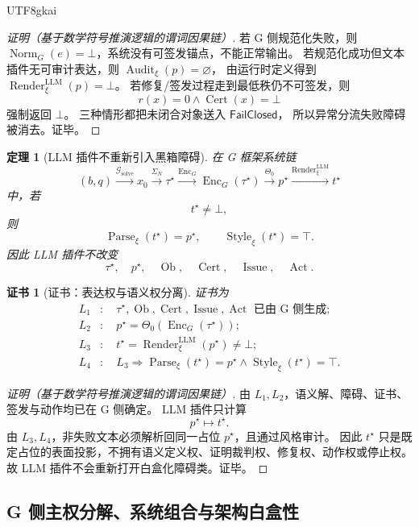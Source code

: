 \documentclass[12pt]{article}
\newtheorem{theorem}{定理}[section]
\newtheorem{Certificate}{证书}[section]
\newcommand{\FailClosed}{\mathsf{FailClosed}}
\newcommand{\Cert}{\operatorname{Cert}}
\newcommand{\Norm}{\operatorname{Norm}}
\newcommand{\Render}{\operatorname{Render}}
\newcommand{\Parse}{\operatorname{Parse}}
\newcommand{\Audit}{\operatorname{Audit}}
\newcommand{\Style}{\operatorname{Style}}
\newcommand{\Issue}{\operatorname{Issue}}
\newcommand{\Enc}{\operatorname{Enc}}
\newcommand{\Act}{\operatorname{Act}}
\begin{document}
\begin{CJK*}{UTF8}{gkai}
\begin{proof}[证明（基于数学符号推演逻辑的谓词因果链）]
若 G 侧规范化失败，则 \(\Norm_G(e)=\bot\)，系统没有可签发锚点，不能正常输出。
若规范化成功但文本插件无可审计表达，则 \(\Audit_\xi(p)=\varnothing\)，
由运行时定义得到 \(\Render_\xi^{\mathrm{LLM}}(p)=\bot\)。
若修复/签发过程走到最低秩仍不可签发，则
\[
  r(x)=0\wedge\Cert(x)=\bot
\]
强制返回 \(\bot\)。
三种情形都把未闭合对象送入 \(\FailClosed\)，
所以异常分流失败障碍被消去。证毕。
\end{proof}

\begin{theorem}[LLM 插件不重新引入黑箱障碍]
\label{thm:tex51-llm-plugin-no-reopen}
在 G 框架系统链
\[
  (b,q)
  \xrightarrow{\mathcal G_{\mathrm{solve}}}
  x_0
  \xrightarrow{\Sigma_N}
  \tau^\star
  \xrightarrow{\Enc_G}
  \Enc_G(\tau^\star)
  \xrightarrow{\Theta_0}
  p^\star
  \xrightarrow{\Render_\xi^{\mathrm{LLM}}}
  t^\star
\]
中，若
\[
  t^\star\ne\bot,
\]
则
\[
  \Parse_\xi(t^\star)=p^\star,
  \qquad
  \Style_\xi(t^\star)=\top.
\]
因此 LLM 插件不改变
\[
  \tau^\star,\quad p^\star,\quad \operatorname{Ob},\quad \Cert,\quad \Issue,\quad \Act.
\]
\end{theorem}

\begin{Certificate}[证书：表达权与语义权分离]
\label{cert:tex51-llm-plugin-no-reopen}
证书为
\[
\begin{aligned}
  L_1&:\quad \tau^\star,\operatorname{Ob},\Cert,\Issue,\Act
  \text{ 已由 G 侧生成};\\
  L_2&:\quad p^\star=\Theta_0(\Enc_G(\tau^\star));\\
  L_3&:\quad t^\star=\Render_\xi^{\mathrm{LLM}}(p^\star)\ne\bot;\\
  L_4&:\quad L_3\Rightarrow \Parse_\xi(t^\star)=p^\star\wedge\Style_\xi(t^\star)=\top.
\end{aligned}
\]
\end{Certificate}

\begin{proof}[证明（基于数学符号推演逻辑的谓词因果链）]
由 \(L_1,L_2\)，语义解、障碍、证书、签发与动作均已在 G 侧确定。
LLM 插件只计算
\[
  p^\star\mapsto t^\star.
\]
由 \(L_3,L_4\)，非失败文本必须解析回同一占位 \(p^\star\)，且通过风格审计。
因此 \(t^\star\) 只是既定占位的表面投影，不拥有语义定义权、证明裁判权、修复权、动作权或停止权。
故 LLM 插件不会重新打开白盒化障碍类。证毕。
\end{proof}

\subsection{G 侧主权分解、系统组合与架构白盒性}
\label{subsec:tex51-g-sovereignty}


\end{CJK*}
\end{document}
